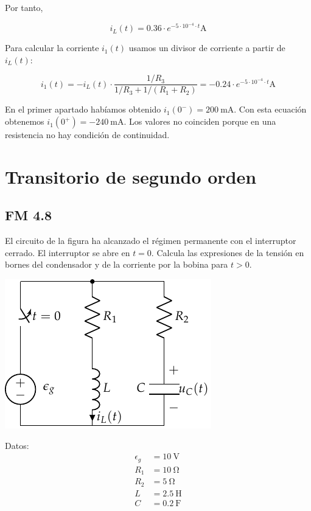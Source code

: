 \documentclass[12pt]{article}
\begin{document}
Por tanto,

\begin{equation*}
  i_L(t) = 0.36 \cdot e^{-5 \cdot 10^{-4} \cdot t}\si{\ampere}
\end{equation*}

Para calcular la corriente $i_1(t)$ usamos un divisor de corriente a partir de $i_L(t)$:

\begin{equation*}
  i_1(t) = -i_L(t) \cdot \frac{1/R_3}{1/R_3 + 1/(R_1 + R_2)} = -0.24 \cdot e^{-5 \cdot 10^{-4} \cdot t}\si{\ampere}
\end{equation*}

En el primer apartado habíamos obtenido $i_1(0^-) = \SI{200}{\milli\ampere}$. Con esta ecuación obtenemos $i_1(0^+) = -\SI{240}{\milli\ampere}$. Los valores no coinciden porque en una resistencia no hay condición de continuidad.

\clearpage

\section{Transitorio de segundo orden}

\subsection{FM 4.8}

El circuito de la figura ha alcanzado el régimen permanente con el interruptor cerrado. El interruptor se abre en $t = 0$. Calcula las expresiones de la tensión en bornes del condensador y de la corriente por la bobina para $t > 0$.

\vspace*{1cm}

\begin{minipage}{0.7\textwidth}
  \includegraphics[scale=0.95]{figs/FM_4_8}
\end{minipage}
\hfill
\begin{minipage}{0.3\textwidth}
Datos:
\begin{align*}
  \epsilon_g &= \SI{10}{\volt}\\
  R_1 &= \SI{10}{\ohm}\\
  R_2 &= \SI{5}{\ohm}\\
  L &= \SI{2.5}{\henry}\\
  C &= \SI{0.2}{\farad}      
\end{align*}
\end{minipage}
\end{document}
